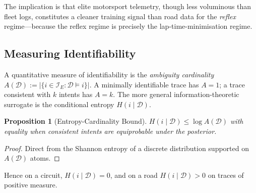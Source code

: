 \documentclass[11pt,twocolumn]{article}
\newtheorem{proposition}[theorem]{Proposition}
\theoremstyle{definition}
\theoremstyle{remark}
\providecommand{\cI}{\mathcal{I}}
\begin{document}
The implication is that elite motorsport telemetry, though less voluminous than fleet logs, constitutes a cleaner training signal than road data for the \emph{reflex} regime---because the reflex regime is precisely the lap-time-minimisation regime.

\subsection{Measuring Identifiability}

A quantitative measure of identifiability is the \emph{ambiguity cardinality} $A(\mathcal{D}) := |\{i \in \cI_E : \mathcal{D} \models i\}|$. A minimally identifiable trace has $A = 1$; a trace consistent with $k$ intents has $A = k$. The more general information-theoretic surrogate is the conditional entropy $H(i \mid \mathcal{D})$.

\begin{proposition}[Entropy-Cardinality Bound]\label{prop:ent-card}
$H(i \mid \mathcal{D}) \le \log A(\mathcal{D})$ with equality when consistent intents are equiprobable under the posterior.
\end{proposition}

\begin{proof}
Direct from the Shannon entropy of a discrete distribution supported on $A(\mathcal{D})$ atoms.
\end{proof}

Hence on a circuit, $H(i \mid \mathcal{D}) = 0$, and on a road $H(i \mid \mathcal{D}) > 0$ on traces of positive measure.
\end{document}
